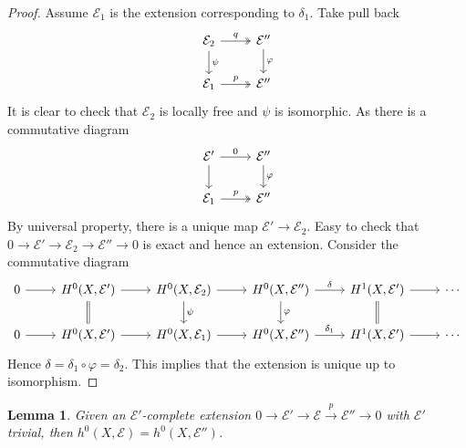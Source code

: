 \documentclass{ctexart}
\newtheorem{lemma}{Lemma}[section]
\begin{document}
\begin{proof}
    Assume $\mathcal{E}_{1}$ is the extension corresponding to $\delta_{1}$.
    Take pull back
    \begin{equation}
        \begin{tikzcd}
            \mathcal{E}_{2} \arrow[r, twoheadrightarrow, "q"] \arrow[d, "\psi"] &
            \mathcal{E}'' \arrow[d, "\varphi"] \\
            \mathcal{E}_{1} \arrow[r, twoheadrightarrow, "p"] &
            \mathcal{E}''
        \end{tikzcd}
    \end{equation}
    It is clear to check that $\mathcal{E}_{2}$ is locally free and $\psi$ is isomorphic.
    As there is a commutative diagram
    \begin{equation}
        \begin{tikzcd}
            \mathcal{E}' \arrow[r, "0"] \arrow[d] &
            \mathcal{E}'' \arrow[d, "\varphi"] \\
            \mathcal{E}_{1} \arrow[r, twoheadrightarrow, "p"] &
            \mathcal{E}''
        \end{tikzcd}
    \end{equation}
    By universal property, there is a unique map $\mathcal{E}' \rightarrow \mathcal{E}_{2}$.
    Easy to check that $0 \rightarrow \mathcal{E}' \rightarrow \mathcal{E}_{2} \rightarrow \mathcal{E}'' \rightarrow 0$ is exact and hence an extension.
    Consider the commutative diagram
    \begin{equation}
        \begin{tikzcd}
            0 \arrow[r] &
            H^{0}(X, \mathcal{E}') \arrow[r] \arrow[d, equal] &
            H^{0}(X, \mathcal{E}_{2}) \arrow[r] \arrow[d, "\psi"] &
            H^{0}(X, \mathcal{E}'') \arrow[r, "\delta"] \arrow[d, "\varphi"] &
            H^{1}(X, \mathcal{E}') \arrow[r] \arrow[d, equal] &
            \cdots \\
            0 \arrow[r] &
            H^{0}(X, \mathcal{E}') \arrow[r] &
            H^{0}(X, \mathcal{E}_{1}) \arrow[r] &
            H^{0}(X, \mathcal{E}'') \arrow[r, "\delta_{1}"] &
            H^{1}(X, \mathcal{E}') \arrow[r] &
            \cdots
        \end{tikzcd}
    \end{equation}
    Hence $\delta = \delta_{1} \circ \varphi = \delta_{2}$.
    This implies that the extension is unique up to isomorphism.
\end{proof}
\begin{lemma}
    Given an $\mathcal{E}'$-complete extension $0 \rightarrow \mathcal{E}' \rightarrow \mathcal{E} \overset{p}{\rightarrow} \mathcal{E}'' \rightarrow 0$ with $\mathcal{E}'$ trivial,
    then $h^{0}(X, \mathcal{E}) = h^{0}(X, \mathcal{E}'')$.
    \label{Lemma 5.13}
\end{lemma}
\end{document}
